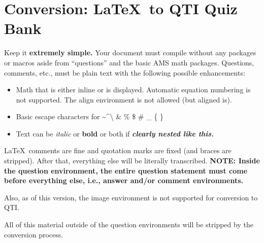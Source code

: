 \documentclass{article}
\begin{document}
\section*{Conversion: \LaTeX \ to QTI Quiz Bank}

Keep it {\bf extremely simple.}
Your document must compile without any packages or macros aside from ``questions'' and the basic AMS math packages.   Questions, comments, etc., must be plain text with the following possible enhancements:
 \begin{itemize}
 \item Math that is either inline or is displayed. Automatic equation numbering is not supported. The align environment is not allowed (but aligned is). %
 \item Basic escape characters for \textasciitilde \textasciicircum \textbackslash
\& \% \$ \# \_ \{ \}
 \item Text can be {\it italic} or {\bf bold} or both if \textbf{\textit{clearly nested like this.}}
 \end{itemize}
\LaTeX~comments are fine and quotation marks are fixed (and braces are stripped). After that, everything else will be literally transcribed.  {\bf NOTE: Inside the question environment, the entire question statement must come before everything else, i.e., answer and/or comment environments.} 

Also, as of this version, the image environment is not supported for conversion to QTI.

All of this material outside of the question environments will be stripped by the conversion process.

\vspace{12pt}
\end{document}
